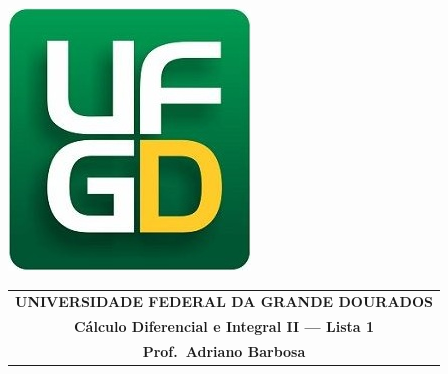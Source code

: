 \documentclass[a4paper,5pt]{amsbook}
\begin{document}
\thispagestyle{empty}
\pagestyle{empty}
\begin{minipage}[h]{0.14\textwidth}
	\includegraphics[scale=0.24]{../../ufgd.png}
\end{minipage}
\begin{minipage}[h]{\textwidth}
\begin{tabular}{c}
{{\bf UNIVERSIDADE FEDERAL DA GRANDE DOURADOS}}\\
{{\bf C\'{a}lculo Diferencial e Integral II --- Lista 1}}\\
{{\bf Prof.\ Adriano Barbosa}}\\
\end{tabular}
\vspace{-0.45cm}
%
\end{minipage}

\end{document}
